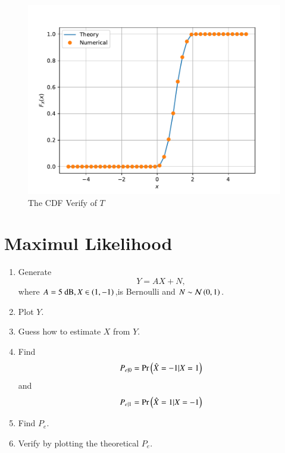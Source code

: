\documentclass[journal,12pt,twocolumn]{IEEEtran}
\renewcommand\thesection{\arabic{section}}
\begin{document}
\begin{enumerate}[label=\thesection.\arabic*
,ref=\thesection.\theenumi]
\begin{figure}
\includegraphics[width=\columnwidth]{./figs/tri_cdf_verify}
\caption{The CDF Verify of $T$}
\label{fig:tri_cdf_verify}
\end{figure}
\end{enumerate}
\section{Maximul Likelihood}
\begin{enumerate}[label=\thesection.\arabic*
,ref=\thesection.\theenumi]
\item Generate 
\begin{equation}
Y = AX+N,
\end{equation}
		where   $A = 5 \text{ dB}, X \in \left(1,-1\right)$,is Bernoulli and $N \sim \mathcal{N}\left(0,1\right)$.
	\item Plot $Y$.
	\item Guess how to estimate $X$ from $Y$.
\item
\label{ml-ch4_sim}
Find 
\begin{equation}
	P_{e|0} = \Pr\left(\hat{X} = -1|X=1\right)
\end{equation}
and 
\begin{equation}
	P_{e|1} = \Pr\left(\hat{X} = 1|X=-1\right)
\end{equation}
%
\item Find $P_e$.
%
\item
Verify by plotting  the theoretical $P_e$.  
		\end{enumerate}
\end{document}

